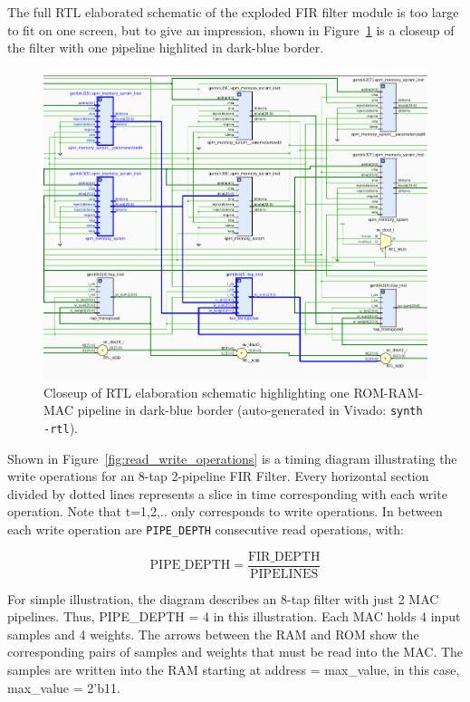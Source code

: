 \documentclass{article}
\begin{document}
    The full RTL elaborated schematic of the exploded FIR filter module is too large to fit on one screen, but to give an impression,
    shown in Figure~\ref{fig:rtl_fir_closeup} is a closeup of the filter with one pipeline highlited in dark-blue border.
    \begin{figure}
        \centering
        \includegraphics[width=1.25\textwidth]{figures/rtl_fir_closeup.png}
        \caption{
            Closeup of RTL elaboration schematic highlighting one ROM-RAM-MAC pipeline in dark-blue border (auto-generated in Vivado: \texttt{synth -rtl}).
        }
        \label{fig:rtl_fir_closeup}
    \end{figure}

    Shown in Figure~\ref{fig:read_write_operations} is a timing diagram illustrating the write operations for an 8-tap 2-pipeline FIR Filter.
    Every horizontal section divided by dotted lines represents a slice in time corresponding with each write operation.
    Note that t=1,2,.. only corresponds to write operations.
    In between each write operation are \texttt{PIPE\_DEPTH} consecutive read operations, with:

    \[
        \text{PIPE\_DEPTH} = \frac{\text{FIR\_DEPTH}}{\text{PIPELINES}}
    \]

    For simple illustration, the diagram describes an 8-tap filter with just 2 MAC pipelines.
    Thus, PIPE\_DEPTH = 4 in this illustration.
    Each MAC holds 4 input samples and 4 weights.
    The arrows between the RAM and ROM show the corresponding pairs of samples and weights that must be read into the MAC.
    The samples are written into the RAM starting at address = max\_value, in this case, max\_value = 2'b11.
\end{document}
